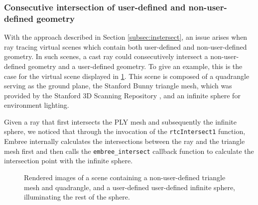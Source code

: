 \subsubsection{Consecutive intersection of user-defined and non-user-defined geometry}

With the approach described in Section \ref{subsec:instersect}, an issue arises when ray tracing virtual scenes which contain both user-defined and non-user-defined geometry. In such scenes, a cast ray could consecutively intersect a non-user-defined geometry and a user-defined geometry. To give an example, this is the case for the virtual scene displayed in \ref{fig:no_bunny}. This scene is composed of a quadrangle serving as the ground plane, the Stanford Bunny triangle mesh, which was provided by the Stanford 3D Scanning Repository \cite{plyRepo}, and an infinite sphere for environment lighting.

Given a ray that first intersects the PLY mesh and subsequently the infinite sphere, we noticed that through the invocation of the \texttt{rtcIntersect1} function, Embree internally calculates the intersections between the ray and the triangle mesh first and then calls the \texttt{embree\_intersect} callback function to calculate the intersection point with the infinite sphere.


\begin{figure}[!tbp]
	\centering
	\hfil
	\caption{Rendered images of a scene containing a non-user-defined triangle mesh and quadrangle, and a user-defined user-defined infinite sphere, illuminating the rest of the sphere.}
	\label{fig:no_bunny}
\end{figure}


